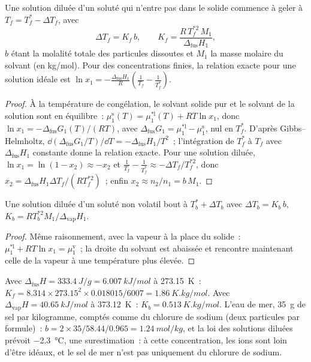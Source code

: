 \begin{theorem}\label{thm:b2:chemical-potential:cryoscopy}
Une solution diluée d'un soluté qui n'entre pas dans le solide commence à geler
à $T_f = T_f^* - \Delta T_f$, avec
\[
  \Delta T_f = K_f\,b, \qquad K_f = \frac{R\,T_f^{*2}\,M_1}{\Delta_{\text{fus}}H_1} ,
\]
$b$ étant la molalité totale des particules dissoutes et $M_1$ la masse molaire
du solvant (en \unit{kg/mol}). Pour des concentrations finies, la relation exacte
pour une solution idéale est $\ln x_1 = -\frac{\Delta_{\text{fus}}H_1}{R}
\left(\frac{1}{T_f} - \frac{1}{T_f^*}\right)$.
\end{theorem}

\begin{proof}
À la température de congélation, le solvant solide pur et le solvant de la solution sont en
équilibre~: $\mu_1^{\text{s}}(T) = \mu_1^{*\text{l}}(T) + RT\ln x_1$, donc
$\ln x_1 = -\Delta_{\text{fus}}G_1(T)/(RT)$, avec $\Delta_{\text{fus}}G_1 =
\mu_1^{*\text{l}} - \mu_1^{\text{s}}$, nul en $T_f^*$. D'après Gibbs--Helmholtz,
$\dd(\Delta_{\text{fus}}G_1/T)/\dd T = -\Delta_{\text{fus}}H_1/T^2$~;
l'intégration de $T_f^*$ à $T_f$ avec $\Delta_{\text{fus}}H_1$ constante donne
la relation exacte. Pour une solution diluée, $\ln x_1 = \ln(1 - x_2) \approx
-x_2$ et $\frac1{T_f} - \frac1{T_f^*} \approx -\Delta T_f/T_f^{*2}$, donc
$x_2 = \Delta_{\text{fus}}H_1\Delta T_f/(RT_f^{*2})$~; enfin $x_2 \approx
n_2/n_1 = b\,M_1$.
\end{proof}

\begin{proposition}\label{prop:b2:chemical-potential:ebullioscopy}
Une solution diluée d'un soluté non volatil bout à $T_b^* + \Delta T_b$ avec
$\Delta T_b = K_b\,b$, $K_b = RT_b^{*2}M_1/\Delta_{\text{vap}}H_1$.
\end{proposition}

\begin{proof}
Même raisonnement, avec la vapeur à la place du solide~: $\mu_1^{*\text{l}} +
RT\ln x_1 = \mu_1^{\text{v}}$~; la droite du solvant est abaissée et rencontre maintenant celle de la
vapeur à une température plus élevée.
\end{proof}

\begin{example}[L'eau]\label{ex:b2:chemical-potential:water-constants}
Avec $\Delta_{\text{fus}}H = \qty{333.4}{J/g} = \qty{6.007}{kJ/mol}$ à
\qty{273.15}{K}~: $K_f = 8.314 \times 273.15^2 \times 0.018015/6007 =
\qty{1.86}{K.kg/mol}$. Avec $\Delta_{\text{vap}}H = \qty{40.65}{kJ/mol}$ à
\qty{373.12}{K}~: $K_b = \qty{0.513}{K.kg/mol}$. L'eau de mer, \qty{35}{g} de sel
par kilogramme, comptés comme du chlorure de sodium (deux particules par formule)~:
$b = 2 \times 35/58.44/0.965 = \qty{1.24}{mol/kg}$, et la loi des solutions diluées
prévoit \qty{-2.3}{\celsius}, une surestimation~: à cette concentration, les
ions sont loin d'être idéaux, et le sel de mer n'est pas uniquement du chlorure de sodium.
\end{example}

